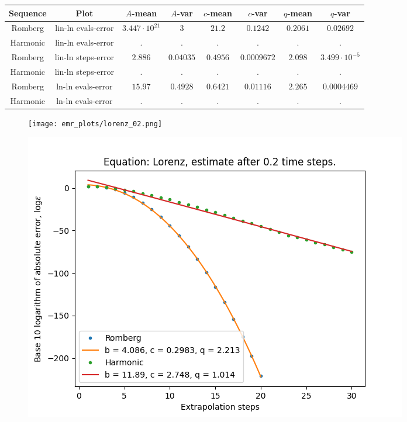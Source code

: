 \begin{table}[H]
    \centering\small
     \begin{tabular}{c|c||c|c|c|c|c|c}
Sequence & Plot & \(A\)-mean & \(A\)-var & \(c\)-mean & \(c\)-var & \(q\)-mean & \(q\)-var\\\hline
Romberg & lin-ln evals-error & \(3.447\cdot 10^{21}\) & \(3\) & \(21.2\) & \(0.1242\) & \(0.2061\) & \(0.02692\) \\
Harmonic & lin-ln evals-error & . & . & . & . & . & . \\
Romberg & lin-ln steps-error & \(2.886\) & \(0.04035\) & \(0.4956\) & \(0.0009672\) & \(2.098\) & \(3.499\cdot 10^{-5}\) \\
Harmonic & lin-ln steps-error & . & . & . & . & . & . \\
Romberg & ln-ln evals-error & \(15.97\) & \(0.4928\) & \(0.6421\) & \(0.01116\) & \(2.265\) & \(0.0004469\) \\
Harmonic & ln-ln evals-error & . & . & . & . & . & . \\
    \end{tabular}
    \label{tab:my_label}
\end{table}

\begin{figure}[H]
\centering
\begin{minipage}{0.45\textwidth}
\centering
\texttt{[image: emr\_plots/lorenz\_02.png]}
\end{minipage}
\begin{minipage}{0.45\textwidth}
\centering
\includegraphics[scale=0.45]{emr_plots/lorenz_02_hp_steps.png}
\end{minipage}
\end{figure}

